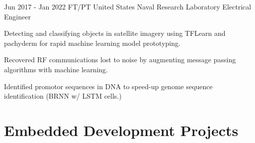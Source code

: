 \documentclass[
	10pt, %
]{FreemanCV}
\begin{document}

\jobentry
	{Jun 2017 - Jan 2022} %
	{FT/PT} %
	{United States Naval Research Laboratory} %
	{Electrical Engineer} %
	{ %
		\item Detecting and classifying objects in satellite imagery using TFLearn and pachyderm for rapid machine learning model prototyping.
		\item Recovered RF communications lost to noise by augmenting message passing algorithms with machine learning.
		\item Identified promotor sequences in DNA to speed-up genome sequence identification (BRNN w/ LSTM cells.)
	} 



\vspace*{-10pt}
\section{Embedded Development Projects}
\setlength{\columnsep}{10pt}
\end{document}
